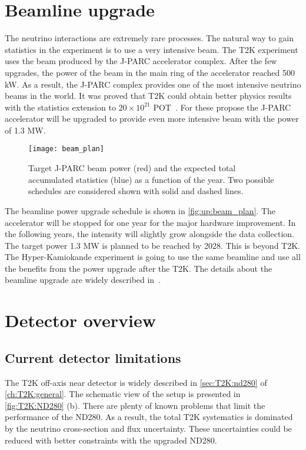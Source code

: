\documentclass[../main.tex]{subfiles}
\begin{document}
\section{Beamline upgrade}
\label{sec:up:beam}
The neutrino interactions are extremely rare processes. The natural way to gain statistics in the experiment is to use a very intensive beam. The T2K experiment uses the beam produced by the J-PARC accelerator complex. After the few upgrades, the power of the beam in the main ring of the accelerator reached 500 kW. As a result, the J-PARC complex provides one of the most intensive neutrino beams in the world. It was proved that T2K could obtain better physics results with the statistics extension to $20\times10^{21}$ POT~\cite{Abe2016e}. For these propose the J-PARC accelerator will be upgraded to provide even more intensive beam with the power of 1.3 MW. 

\begin{figure}[!ht]
  \centering
  \texttt{[image: beam\_plan]}
  \caption{Target J-PARC beam power (red) and the expected total accumulated statistics (blue) as a function of the year. Two possible schedules are considered shown with solid and dashed lines.}
  \label{fig:up:beam_plan}
\end{figure}

The beamline power upgrade schedule is shown in \autoref{fig:up:beam_plan}. The accelerator will be stopped for one year for the major hardware improvement. In the following years, the intensity will slightly grow alongside the data collection. The target power 1.3 MW is planned to be reached by 2028. This is beyond T2K. The Hyper-Kamiokande experiment is going to use the same beamline and use all the benefits from the power upgrade after the T2K. The details about the beamline upgrade are widely described in~\cite{Abe2019h}.

\section{Detector overview}
\label{sec:up:nd}


\subsection{Current detector limitations}
The T2K off-axis near detector is widely described in \autoref{sec:T2K:nd280} of \autoref{ch:T2K:general}. The schematic view of the setup is presented in \autoref{fig:T2K:ND280} (b). There are plenty of known problems that limit the performance of the ND280. As a result, the total T2K systematics is dominated by the neutrino cross-section and flux uncertainty. These uncertainties could be reduced with better constraints with the upgraded ND280. 
\end{document}
